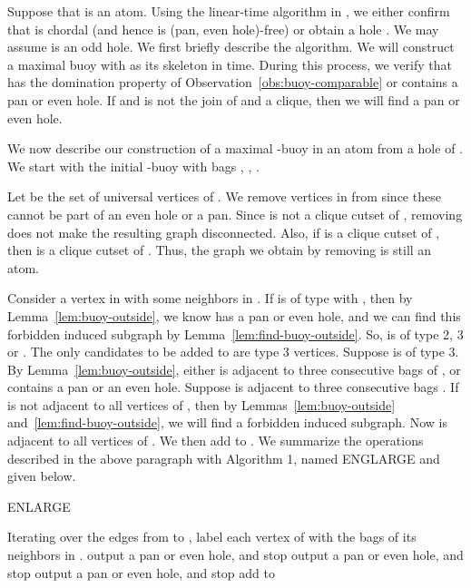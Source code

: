 \documentclass[11pt,a4paper]{article}
\newenvironment{proof}{\noindent {\it Proof:~}}{\hfill \smallskip\par}
\begin{document}
\begin{proof}
Suppose that  is an atom.  Using the linear-time algorithm in
\cite{TarYan1984}, we either confirm that  is chordal (and
hence is (pan, even hole)-free) or obtain a hole . We may
assume  is an odd hole. We first briefly describe the
algorithm. We will construct a maximal buoy  with  as its
skeleton in  time. During this process, we verify that 
has the domination property of
Observation~\ref{obs:buoy-comparable} or  contains a pan or
even hole. If  and  is not the join of  and a
clique, then we will find a pan or even hole.

We now describe our construction of a maximal -buoy  in
an atom  from a hole  of .
We start with the initial -buoy  with bags , , .

Let  be the set of universal vertices of . We remove
vertices in  from  since these cannot be part of an even
hole or a pan. Since  is not a clique cutset of , removing
 does not make the resulting graph disconnected. Also, if 
is a clique cutset of , then  is a clique cutset of
. Thus, the graph we obtain by removing  is still an atom.

Consider a vertex  in  with some neighbors in . If
 is of type  with , then by
Lemma~\ref{lem:buoy-outside}, we know  has a pan or even hole,
and we can find this forbidden induced subgraph by
Lemma~\ref{lem:find-buoy-outside}. So,  is of type 2, 3 or
. The only candidates to be added to  are type 3
vertices.  Suppose  is of type 3. By
Lemma~\ref{lem:buoy-outside}, either  is adjacent to three
consecutive bags  of , or  contains a
pan or an even hole. Suppose  is adjacent to three consecutive
bags . If  is not adjacent to all
vertices of , then by Lemmas~\ref{lem:buoy-outside}
and~\ref{lem:find-buoy-outside}, we will find a forbidden induced
subgraph. Now  is adjacent to all vertices of . We then
add  to . We summarize the operations described in the
above paragraph with Algorithm 1, named ENGLARGE and given below.
\begin{algorithm}
\caption{ENLARGE} \label{alg:enlarge}
\begin{algorithmic}

    \STATE
    \STATE Iterating over the edges from  to ,  label
    each vertex of  with the bags of its
neighbors in .
             \STATE output a pan or even hole, and stop
       \ENDIF
             \STATE   output a pan or even hole, and stop
       \ENDIF
                       \STATE output a pan or even hole, and stop
            \ELSE
            \STATE add  to 
            \ENDIF
        \ENDIF
    \ENDFOR


\end{algorithmic}
\end{algorithm}
\end{proof}
\end{document}
